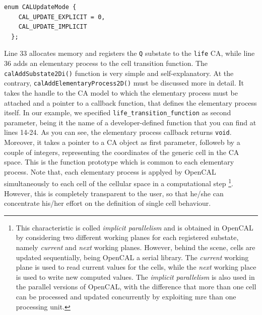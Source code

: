 \begin{lstlisting}[float,floatplacement=H, label=lst:CALUpdateMode, caption=The CALUpdateMode enum type., numbers=none]
  enum CALUpdateMode {
    CAL_UPDATE_EXPLICIT = 0,
    CAL_UPDATE_IMPLICIT
  };
\end{lstlisting}

Line 33 allocates memory and registers the \verb'Q' substate to the
\verb'life' CA, while line 36 adds an elementary process to the cell
transition function. The \verb'calAddSubstate2Di()' function is very
simple and self-explanatory. At the contrary,
\verb'calAddElementaryProcess2D()' must be discussed more in
detail. It takes the handle to the CA model to which the elementary
process must be attached and a pointer to a callback function, that
defines the elementary process itself. In our example, we specified
\verb'life_transition_function' as second parameter, being it the name
of a developer-defined function that you can find at lines 14-24. As
you can see, the elementary process callback returns
\verb'void'. Moreover, it takes a pointer to a CA object as first
parameter, followeb by a couple of integers, representing the
coordinates of the generic cell in the CA space. This is the function
prototype which is common to each elementary process. Note that, each
elementary process is applyed by OpenCAL simultaneously to each cell
of the cellular space in a computational step \footnote{This
  characteristic is colled \emph{implicit parallelism} and is obtained
  in OpenCAL by considering two different working planes for each
  registered substate, namely \emph{current} and \emph{next} working
  planes. However, behind the scene, cells are updated sequentially,
  being OpenCAL a serial library. The \emph{current} working plane is
  used to read current values for the cells, while the \emph{next}
  working place is used to write new computed values. The
  \emph{implicit parallelism} is also used in the parallel versions of
  OpenCAL, with the difference that more than one cell can be
  processed and updated concurrently by exploiting mre than one
  processing unit.}. However, this is completely transparent to the
user, so that he/she can concentrate his/her effort on the definition
of single cell behaviour.

